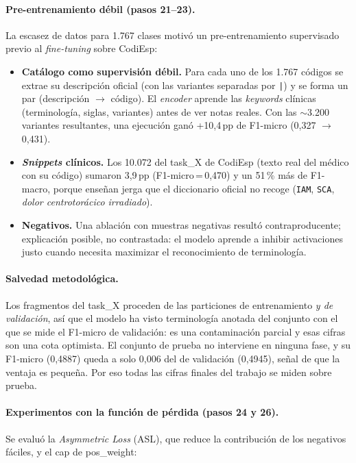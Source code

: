 \paragraph{Pre-entrenamiento débil (pasos 21--23).}
La escasez de datos para 1.767 clases motivó un pre-entrenamiento supervisado previo al \emph{fine-tuning} sobre CodiEsp:

\begin{itemize}
 \item \textbf{Catálogo como supervisión débil.} Para cada uno de los 1.767 códigos se extrae su descripción oficial (con las variantes separadas por \texttt{|}) y se forma un par (descripción $\to$ código). El \emph{encoder} aprende las \emph{keywords} clínicas (terminología, siglas, variantes) antes de ver notas reales. Con las $\sim$3.200 variantes resultantes, una ejecución ganó +10,4\,pp de F1-micro (0,327 $\to$ 0,431).
 \item \textbf{\emph{Snippets} clínicos.} Los 10.072 del task\_X de CodiEsp (texto real del médico con su código) sumaron 3,9\,pp (F1-micro\,=\,0,470) y un 51\,\% más de F1-macro, porque enseñan jerga que el diccionario oficial no recoge (\texttt{IAM}, \texttt{SCA}, \emph{dolor centrotorácico irradiado}).
 \item \textbf{Negativos.} Una ablación con muestras negativas resultó contraproducente; explicación posible, no contrastada: el modelo aprende a inhibir activaciones justo cuando necesita maximizar el reconocimiento de terminología.
\end{itemize}

\paragraph{Salvedad metodológica.} Los fragmentos del task\_X proceden de las particiones de entrenamiento \emph{y de validación}, así que el modelo ha visto terminología anotada del conjunto con el que se mide el F1-micro de validación: es una contaminación parcial y esas cifras son una cota optimista. El conjunto de prueba no interviene en ninguna fase, y su F1-micro (0,4887) queda a solo 0,006 del de validación (0,4945), señal de que la ventaja es pequeña. Por eso todas las cifras finales del trabajo se miden sobre prueba.

\paragraph{Experimentos con la función de pérdida (pasos 24 y 26).}
Se evaluó la \emph{Asymmetric Loss} (ASL), que reduce la contribución de los negativos fáciles, y el cap de pos\_weight:

